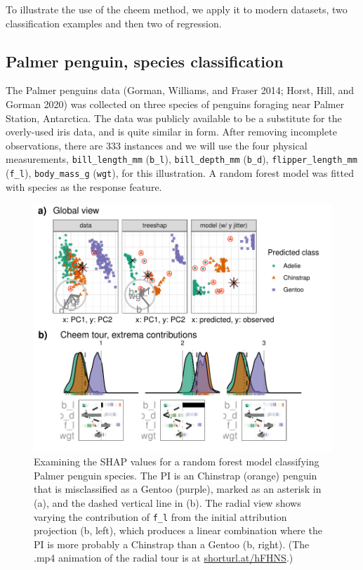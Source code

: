 \documentclass[
]{article}
\begin{document}
To illustrate the use of the cheem method, we apply it to modern datasets, two classification examples and then two of regression.

\hypertarget{palmer-penguin-species-classification}{%
\subsection{Palmer penguin, species classification}\label{palmer-penguin-species-classification}}

The Palmer penguins data (Gorman, Williams, and Fraser 2014; Horst, Hill, and Gorman 2020) was collected on three species of penguins foraging near Palmer Station, Antarctica. The data was publicly available to be a substitute for the overly-used iris data, and is quite similar in form. After removing incomplete observations, there are 333 instances and we will use the four physical measurements, \texttt{bill\_length\_mm} (\texttt{b\_l}), \texttt{bill\_depth\_mm} (\texttt{b\_d}), \texttt{flipper\_length\_mm} (\texttt{f\_l}), \texttt{body\_mass\_g} (\texttt{wgt}), for this illustration. A random forest model was fitted with species as the response feature.



\begin{figure}

{\centering \includegraphics[width=1\linewidth]{./figures/case_penguins} 

}

\caption{Examining the SHAP values for a random forest model classifying Palmer penguin species. The PI is an Chinstrap (orange) penguin that is misclassified as a Gentoo (purple), marked as an asterisk in (a), and the dashed vertical line in (b). The radial view shows varying the contribution of \texttt{f\_l} from the initial attribution projection (b, left), which produces a linear combination where the PI is more probably a Chinstrap than a Gentoo (b, right). (The .mp4 animation of the radial tour is at \href{https://github.com/nspyrison/cheem_paper/blob/main/figures/case_penguins.mp4}{shorturl.at/hFHNS}.)}\label{fig:casepenguins}
\end{figure}
\end{document}

